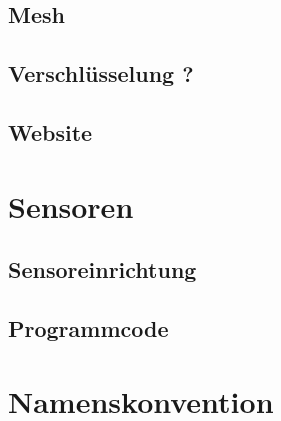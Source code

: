 \subsection{Mesh}

\subsection{Verschlüsselung ?}

\subsection{Website}



\section{Sensoren}

\subsection{Sensoreinrichtung}

\subsection{Programmcode}

\section{Namenskonvention}
